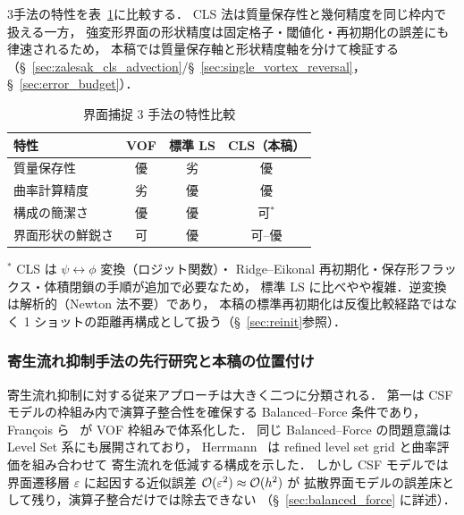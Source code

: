 3手法の特性を表~\ref{tab:method_comparison}に比較する．
CLS 法は質量保存性と幾何精度を同じ枠内で扱える一方，
強変形界面の形状精度は固定格子・閾値化・再初期化の誤差にも律速されるため，
本稿では質量保存軸と形状精度軸を分けて検証する
（§~\ref{sec:zalesak_cls_advection}/§~\ref{sec:single_vortex_reversal}，§~\ref{sec:error_budget}）．

\begin{table}[htbp]
\centering
\caption{界面捕捉 3 手法の特性比較}
\label{tab:method_comparison}
\renewcommand{\arraystretch}{\PaperTableArrayStretch}
\begin{tabular}{lccc}
\hline
特性               & VOF & 標準 LS & CLS（本稿） \\
\hline
質量保存性         & 優  & 劣      & 優 \\
曲率計算精度       & 劣  & 優      & 優 \\
構成の簡潔さ       & 優  & 優      & 可$^*$ \\
界面形状の鮮鋭さ   & 可  & 優      & 可--優 \\
\hline
\end{tabular}

{\footnotesize $^*$ CLS は $\psi \leftrightarrow \phi$ 変換（ロジット関数）・
Ridge--Eikonal 再初期化・保存形フラックス・体積閉鎖の手順が追加で必要なため，
標準 LS に比べやや複雑．逆変換は解析的（Newton 法不要）であり，
本稿の標準再初期化は反復比較経路ではなく 1 ショットの距離再構成として扱う（§~\ref{sec:reinit}参照）．}
\end{table}

\subsubsection{寄生流れ抑制手法の先行研究と本稿の位置付け}

寄生流れ抑制に対する従来アプローチは大きく二つに分類される．
第一は CSF モデルの枠組み内で演算子整合性を確保する Balanced--Force 条件であり，
Fran{\c{c}}ois ら~\cite{Francois2006} が VOF 枠組みで体系化した．
同じ Balanced--Force の問題意識は Level Set 系にも展開されており，
Herrmann~\cite{Herrmann2008} は refined level set grid と曲率評価を組み合わせて
寄生流れを低減する構成を示した．
しかし CSF モデルでは界面遷移層 $\varepsilon$ に起因する近似誤差 $\mathcal{O}(\varepsilon^2) \approx \mathcal{O}(h^2)$ が
拡散界面モデルの誤差床として残り，演算子整合だけでは除去できない
（§~\ref{sec:balanced_force} に詳述）．

